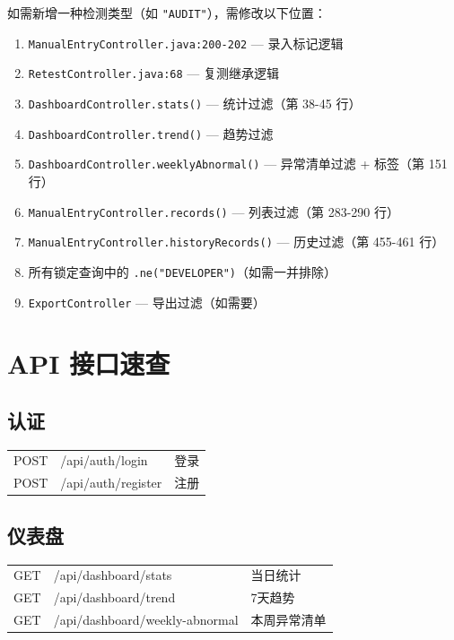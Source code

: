 \documentclass[12pt,a4paper]{ctexart}
\begin{document}
如需新增一种检测类型（如 \texttt{"AUDIT"}），需修改以下位置：
\begin{enumerate}
    \item \texttt{ManualEntryController.java:200-202} — 录入标记逻辑
    \item \texttt{RetestController.java:68} — 复测继承逻辑
    \item \texttt{DashboardController.stats()} — 统计过滤（第 38-45 行）
    \item \texttt{DashboardController.trend()} — 趋势过滤
    \item \texttt{DashboardController.weeklyAbnormal()} — 异常清单过滤 + 标签（第 151 行）
    \item \texttt{ManualEntryController.records()} — 列表过滤（第 283-290 行）
    \item \texttt{ManualEntryController.historyRecords()} — 历史过滤（第 455-461 行）
    \item 所有锁定查询中的 \texttt{.ne("DEVELOPER")}（如需一并排除）
    \item \texttt{ExportController} — 导出过滤（如需要）
\end{enumerate}

\newpage
\section{API 接口速查}

\subsection{认证}

\begin{tabular}{|l|l|l|}
\hline
POST & /api/auth/login & 登录 \\
POST & /api/auth/register & 注册 \\
\hline
\end{tabular}

\subsection{仪表盘}

\begin{tabular}{|l|l|l|}
\hline
GET & /api/dashboard/stats & 当日统计 \\
GET & /api/dashboard/trend & 7天趋势 \\
GET & /api/dashboard/weekly-abnormal & 本周异常清单 \\
\hline
\end{tabular}
\end{document}

